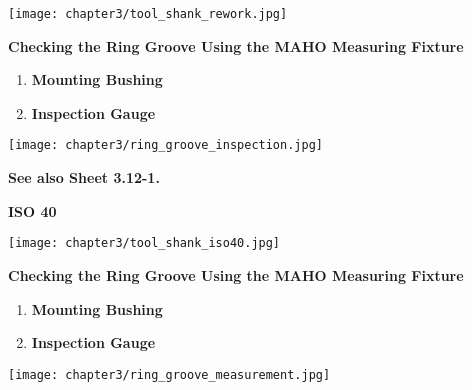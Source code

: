 \begin{minipage}{\textwidth}
    \centering
    \texttt{[image: chapter3/tool\_shank\_rework.jpg]}
\end{minipage}

\vspace{0.5cm}

\textbf{Checking the Ring Groove Using the MAHO Measuring Fixture}

\begin{enumerate}[itemsep=1pt,parsep=0pt]
    \item \textbf{Mounting Bushing}
    \item \textbf{Inspection Gauge}
\end{enumerate}

\vspace{0.5cm}

\begin{minipage}{\textwidth}
    \centering
    \texttt{[image: chapter3/ring\_groove\_inspection.jpg]}
\end{minipage}

\vspace{0.5cm}

\textbf{See also Sheet 3.12-1.}


\setcounter{page}{3}

\textbf{ISO 40}

\vspace{0.5cm}

\begin{minipage}{\textwidth}
    \centering
    \texttt{[image: chapter3/tool\_shank\_iso40.jpg]}
\end{minipage}

\vspace{0.5cm}

\textbf{Checking the Ring Groove Using the MAHO Measuring Fixture}

\begin{enumerate}[itemsep=1pt,parsep=0pt]
    \item \textbf{Mounting Bushing}
    \item \textbf{Inspection Gauge}
\end{enumerate}

\vspace{0.5cm}

\begin{minipage}{\textwidth}
    \centering
    \texttt{[image: chapter3/ring\_groove\_measurement.jpg]}
\end{minipage}

